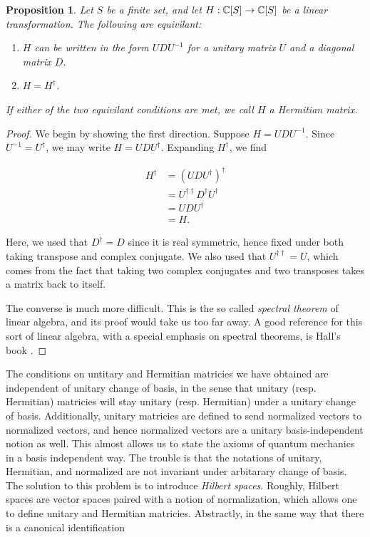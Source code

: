 \documentclass{article}
\newtheorem{proposition}{Proposition}[section]
\theoremstyle{definition}
\numberwithin{figure}{section}
\begin{document}
\begin{proposition} Let $S$ be a finite set, and let $H: \mathbb{C}[S]\to \mathbb{C}[S]$ be a linear transformation. The following are equivilant:

\begin{enumerate}
\item $H$ can be written in the form $UDU^{-1}$ for a unitary matrix $U$ and a diagonal matrix $D$.
\item $H=H^{\dagger}$.
\end{enumerate}

If either of the two equivilant conditions are met, we call $H$ a Hermitian matrix.
\end{proposition}
\begin{proof} We begin by showing the first direction. Suppose $H=UDU^{-1}$. Since $U^{-1}=U^{\dagger}$, we may write $H=UDU^{\dagger}$. Expanding $H^{\dagger}$, we find

\begin{align*}
H^{\dagger}&=(UDU^{\dagger})^{\dagger}\\
&=U^{\dagger\dagger}D^{\dagger}U^{\dagger}\\
&=UDU^{\dagger}\\
&=H.
\end{align*}

Here, we used that $D^{\dagger}=D$ since it is real symmetric, hence fixed under both taking transpose and complex conjugate. We also used that $U^{\dagger\dagger}=U$, which comes from the fact that taking two complex conjugates and two transposes takes a matrix back to itself.

The converse is much more difficult. This is the so called \textit{spectral theorem} of linear algebra, and its proof would take us too far away. A good reference for this sort of linear algebra, with a special emphasis on spectral theorems, is Hall's book \cite{hall2013quantum}.
\end{proof}
 
The conditions on untitary and Hermitian matricies we have obtained are independent of unitary change of basis, in the sense that unitary (resp. Hermitian) matricies will stay unitary (resp. Hermitian) under a unitary change of basis. Additionally, unitary matricies are defined to send normalized vectors to normalized vectors, and hence normalized vectors are a unitary basis-independent notion as well. This almost allows us to state the axioms of quantum mechanics in a basis independent way. The trouble is that the notations of unitary, Hermitian, and normalized are not invariant under arbitarary change of basis. The solution to this problem is to introduce \textit{Hilbert spaces}. Roughly, Hilbert spaces are vector spaces paired with a notion of normalization, which allows one to define unitary and Hermitian matricies. Abstractly, in the same way that there is a canonical identification
\end{document}
